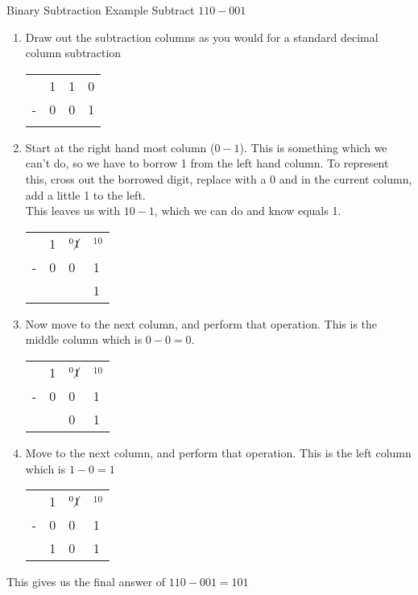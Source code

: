 \begin{example}{Binary Subtraction Example}
Subtract $110-001$
\begin{enumerate}
    \item Draw out the subtraction columns as you would for a standard decimal column subtraction
    \begin{table}[H]
        \centering
        \begin{tabularx}{0.2\textwidth}{XXXX}
             & 1 & 1 & 0 \\
             - & 0 & 0 & 1\\
             \hline
              & & & \\
        \end{tabularx}
    \end{table}
    \item Start at the right hand most column ($0-1$). This is something which we can't do, so we have to borrow 1 from the left hand column. To represent this, cross out the borrowed digit, replace with a 0 and in the current column, add a little 1 to the left. \\
    This leaves us with $10-1$, which we can do and know equals 1. 
    \begin{table}[H]
        \centering
        \begin{tabularx}{0.2\textwidth}{XXXX}
             & 1 & $^0\cancel{1}$ & $^10$ \\
             - & 0 & 0 & 1\\
             \hline
              & & & 1 \\
        \end{tabularx}
    \end{table}
    \item Now move to the next column, and perform that operation. This is the middle column which is $0-0=0$.
    \begin{table}[H]
        \centering
        \begin{tabularx}{0.2\textwidth}{XXXX}
             & 1 & $^0\cancel{1}$ & $^10$ \\
             - & 0 & 0 & 1\\
             \hline
              & & 0 & 1 \\
        \end{tabularx}
    \end{table}
    \item Move to the next column, and perform that operation. This is the left column which is $1-0=1$
    \begin{table}[H]
        \centering
        \begin{tabularx}{0.2\textwidth}{XXXX}
             & 1 & $^0\cancel{1}$ & $^10$ \\
             - & 0 & 0 & 1\\
             \hline
              & 1 & 0 & 1 \\
        \end{tabularx}
    \end{table}
\end{enumerate}
This gives us the final answer of $110-001=101$
\end{example}

